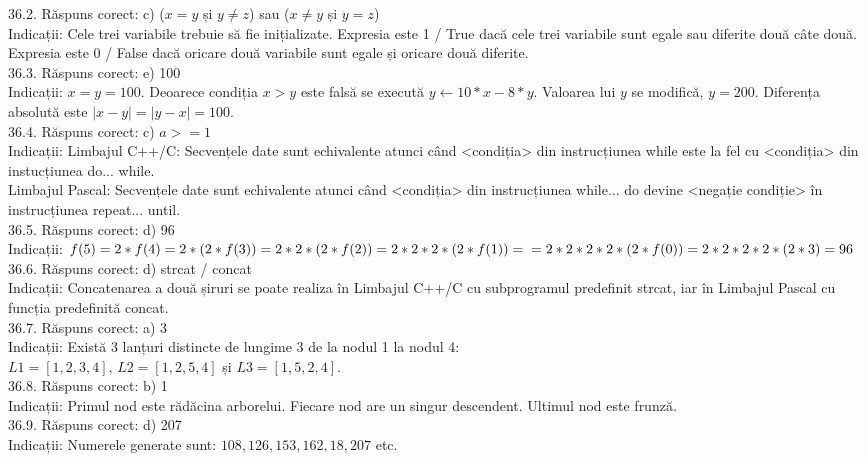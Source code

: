 36.2. Răspuns corect: c) ($x=y$ și $y \neq z$) sau ($x \neq y$ și $y=z$)\\
Indicații: Cele trei variabile trebuie să fie inițializate. Expresia este 1 / True dacă cele trei variabile sunt egale sau diferite două câte două. Expresia este 0 / False dacă oricare două variabile sunt egale și oricare două diferite.\\

36.3. Răspuns corect: e) 100\\
Indicații: $x=y=100$. Deoarece condiția $x > y$ este falsă se execută $y \leftarrow 10 * x-8 * y$. Valoarea lui $y$ se modifică, $y=200$. Diferența absolută este $|x-y|=|y-x|=100$.\\

36.4. Răspuns corect: c) $a>=1$\\
Indicații: Limbajul C++/C: Secvențele date sunt echivalente atunci când <condiția> din instrucțiunea while este la fel cu <condiția> din instucțiunea do... while.\\ Limbajul Pascal: Secvențele date sunt echivalente atunci când <condiția> din instrucțiunea while... do devine <negație condiție> în instrucțiunea repeat... until.\\

36.5. Răspuns corect: d) 96\\
Indicații: $f(5)=2 * f(4)=2 *(2 * f(3))=2 * 2 *(2 * f(2))=2 * 2 * 2 *(2 * f(1))= \\ =2 * 2 * 2 * 2 *(2 * f(0))=2 * 2 * 2 * 2 *(2 * 3)=96$\\

36.6. Răspuns corect: d) strcat / concat\\
Indicații: Concatenarea a două șiruri se poate realiza în Limbajul C++/C cu subprogramul predefinit strcat, iar în Limbajul Pascal cu funcția predefinită concat.\\

36.7. Răspuns corect: a) 3\\
Indicații: Există 3 lanțuri distincte de lungime 3 de la nodul 1 la nodul 4:\\ $L1=[1,2,3,4]$, $L2=[1,2,5,4]$ și $L3=[1,5,2,4]$.\\

36.8. Răspuns corect: b) 1\\
Indicații: Primul nod este rădăcina arborelui. Fiecare nod are un singur descendent. Ultimul nod este frunză.\\

36.9. Răspuns corect: d) 207\\
Indicații: Numerele generate sunt: $108,126,153,162,18,207$ etc.\\

